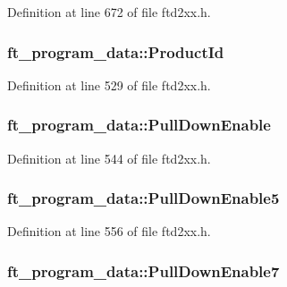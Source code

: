 Definition at line 672 of file ftd2xx.h.\hypertarget{structft__program__data_a623b7980fadab4322ed41da598b45397}{
\subsubsection[{ProductId}]{ {\bf ft\_\-program\_\-data::ProductId}}}
\label{structft__program__data_a623b7980fadab4322ed41da598b45397}


Definition at line 529 of file ftd2xx.h.\hypertarget{structft__program__data_a922454432fb9098f4ce4cb6675be85e6}{
\subsubsection[{PullDownEnable}]{ {\bf ft\_\-program\_\-data::PullDownEnable}}}
\label{structft__program__data_a922454432fb9098f4ce4cb6675be85e6}


Definition at line 544 of file ftd2xx.h.\hypertarget{structft__program__data_a24f71286b69d74eb238a97a2643e8dba}{
\subsubsection[{PullDownEnable5}]{ {\bf ft\_\-program\_\-data::PullDownEnable5}}}
\label{structft__program__data_a24f71286b69d74eb238a97a2643e8dba}


Definition at line 556 of file ftd2xx.h.\hypertarget{structft__program__data_a54302ec0f17b20394a99db0bfdac50fd}{
\subsubsection[{PullDownEnable7}]{ {\bf ft\_\-program\_\-data::PullDownEnable7}}}
\label{structft__program__data_a54302ec0f17b20394a99db0bfdac50fd}


